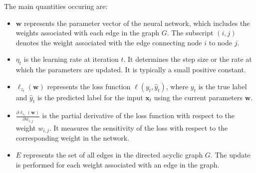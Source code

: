 \begin{itemize}
The main quantities occuring are:

\begin{itemize}
\item $\bm{w}$ represents the parameter vector of the neural network, which includes the weights associated with each edge in the graph $G$. The subscript $(i,j)$ denotes the weight associated with the edge connecting node $i$ to node $j$.
\item $\eta_t$ is the learning rate at iteration $t$. It determines the step size or the rate at which the parameters are updated. It is typically a small positive constant.
\item $\ell_{z_t}(\bm{w})$ represents the loss function $\ell(y_t, \hat{y}_t)$, where $y_t$ is the true label and $\hat{y}_t$ is the predicted label for the input $\bm{x}_t$ using the current parameters $\bm{w}$.
\item $\frac{\partial \ell_{z_t} (\bm{w})}{\partial w_{i,j}}$ is the partial derivative of the loss function with respect to the weight $w_{i,j}$. It measures the sensitivity of the loss with respect to the corresponding weight in the network.
\item $E$ represents the set of all edges in the directed acyclic graph $G$. The update is performed for each weight associated with an edge in the graph.
\end{itemize}
            
\end{itemize}
